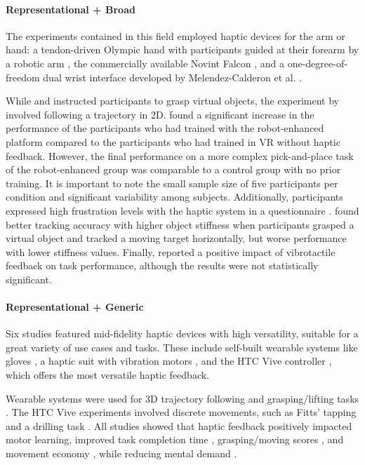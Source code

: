 \paragraph{Representational + Broad} \label{sec:representationalbroad}
The experiments contained in this field employed haptic devices for the arm or hand: a tendon-driven Olympic hand with participants guided at their forearm by a robotic arm \cite{Chappell2022}, the commercially available Novint Falcon \cite{Gambaro2014}, and a one-degree-of-freedom dual wrist interface \cite{Perez2023} developed by Melendez-Calderon et al. \cite{Melendez-Calderon2011Hi5:Control}.

While \cite{Chappell2022} and \cite{Perez2023} instructed participants to grasp virtual objects, the experiment by \cite{Gambaro2014} involved following a trajectory in 2D. 
\cite{Chappell2022} found a significant increase in the performance of the participants who had trained with the robot-enhanced platform compared to the participants who had trained in VR without haptic feedback. However, the final performance on a more complex pick-and-place task of the robot-enhanced group was comparable to a control group with no prior training. It is important to note the small sample size of five participants per condition and significant variability among subjects. Additionally, participants expressed high frustration levels with the haptic system in a questionnaire \cite{Chappell2022}.
\cite{Perez2023} found better tracking accuracy with higher object stiffness when participants grasped a virtual object and tracked a moving target horizontally, but worse performance with lower stiffness values.
Finally, \cite{Gambaro2014} reported a positive impact of vibrotactile feedback on task performance, although the results were not statistically significant. 

\paragraph{Representational + Generic} \label{sec:representationalgeneric}

Six studies featured mid-fidelity haptic devices with high versatility, suitable for a great variety of use cases and tasks. These include self-built wearable systems like gloves \cite{LiuH2019, Trinitatova2023}, a haptic suit with vibration motors \cite{Xia2023}, and the HTC Vive controller \cite{Vasudevan2020, Yang2023, McAnally2023}, which offers the most versatile haptic feedback.

Wearable systems were used for 3D trajectory following \cite{Trinitatova2023, Xia2023} and grasping/lifting tasks \cite{LiuH2019}. The HTC Vive experiments involved discrete movements, such as Fitts' tapping \cite{Vasudevan2020, McAnally2023} and a drilling task \cite{Yang2023}. All studies showed that haptic feedback positively impacted motor learning, improved task completion time \cite{Yang2023, McAnally2023}, grasping/moving scores \cite{LiuH2019}, and movement economy \cite{McAnally2023}, while reducing mental demand \cite{Trinitatova2023, Yang2023}. 

